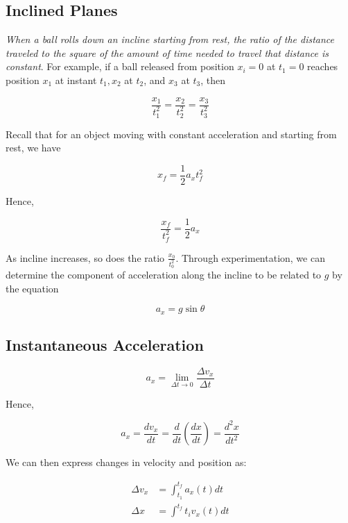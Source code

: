     \subsection{Inclined Planes}
        \textit{When a ball rolls down an incline starting from rest, the ratio of the distance traveled to the square of the amount of time needed to travel that distance is constant}. For example, if a ball released
        from position $x_i=0$ at $t_1=0$ reaches position $x_1$ at instant $t_1,x_2$ at $t_2$, and $x_3$ at $t_3$, then

        \[
            \frac{x_1}{t^2_1}=\frac{x_2}{t^2_2}=\frac{x_3}{t^2_3}
        \]

        Recall that for an object moving with constant acceleration and starting from rest, we have

        \[
            x_f = \frac{1}{2} a_x t^2_f
        \]

        Hence,

        \[
            \frac{x_f}{t^2_f} = \frac{1}{2} a_x
        \]

        As incline increases, so does the ratio $\frac{x_0}{t^2_0}$. Through experimentation, we can determine the component of acceleration along the incline to be related to $g$ by the equation

        \[
            a_x = g\sin\theta
        \]




    \subsection{Instantaneous Acceleration}
        \[
            a_x = \lim_{\Delta t \to 0} \frac{\Delta v_x}{\Delta t}
        \]

        Hence,

        \[
            a_x = \frac{dv_x}{dt} = \frac{d}{dt} \left(\frac{dx}{dt}\right) = \frac{d^2 x}{dt^2}
        \]

        We can then express changes in velocity and position as:

        \begin{align*}
            \Delta v_x   &= \int^{t_f}_{t_1} a_x (t) dt \\
            \Delta x     &= \int^{t_f}{t_i} v_x (t)dt
        \end{align*}



